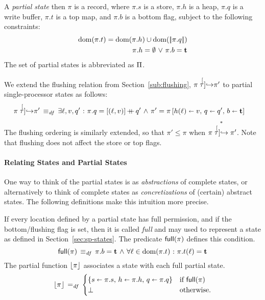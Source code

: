 \documentclass[11pt]{report}
\begin{document}
A \emph{partial state} then $\pi$ is a record, where $\pi.s$ is a store, $\pi.h$ is a heap, $\pi.q$ is a write buffer, $\pi.t$ is a top map, and $\pi.b$ is a bottom flag, subject to the following constraints: \begin{align}
	\operatorname{\mathrm{dom}}(\pi.t) = \operatorname{\mathrm{dom}}(\pi.h) \cup \operatorname{\mathrm{dom}}(|\!|\pi.q|\!|) \\
	\pi.h = \operatorname{\emptyset} \operatorname{\,\vee\,} \pi.b = \mathbf{t}
\end{align} The set of partial states is abbreviated as $\Pi$.

We extend the flushing relation from Section~\ref{sub:flushing}, $\pi \stackrel[\tau]{}{\operatorname{\hookrightarrow}} \pi'$ to partial single-processor states as follows:  \begin{equation}
\begin{split}
	\label{eq:ptaustep}
	\pi \stackrel[\tau]{}{\operatorname{\hookrightarrow}} \pi' \operatorname{\;\equiv_{\mathit{df}}\;} {} & \exists \ell, v, q' \operatorname{\,:\,} \pi.q = \left[(\ell,v)\right]\operatorname{+\!\!\!+} q' \operatorname{\,\wedge\,} \pi' = \pi \left[ h(\ell) \shortleftarrow v,\,q \shortleftarrow q',\,b \shortleftarrow \mathbf{t} \right]
\end{split}
\end{equation} The flushing ordering is similarly extended, so that $\pi' \leq \pi$ when $\pi \stackrel{\ast}{\stackrel[\tau]{}{\operatorname{\hookrightarrow}}} \pi'$. Note that flushing does not affect the store or top flags. 

\paragraph{Relating States and Partial States}

One way to think of the partial states is as \emph{abstractions} of complete states, or alternatively to think of complete states as \emph{concretizations} of (certain) abstract states. The following definitions make this intuition more precise. 

If every location defined by a partial state has full permission, and if the bottom/flushing flag is set, then it is called \emph{full} and may used to represent a state as defined in Section~\ref{sec:sp-states}. The predicate $\mathsf{full}(\pi)$ defines this condition. \begin{equation}
	\mathsf{full}(\pi)  \operatorname{\;\equiv_{\mathit{df}}\;}   \pi.b = \mathbf{t} \operatorname{\,\wedge\,} \forall \ell \in \operatorname{\mathrm{dom}}(\pi.t) \operatorname{\,:\,} \pi.t(\ell) = \mathbf{t} 
\end{equation}
The partial function $\left\lfloor\pi\right\rfloor$ associates a state with each full partial state. \begin{equation}
	\left\lfloor\pi\right\rfloor \operatorname{\;=_{\mathit{df}}\;} \begin{cases}
		\left\lbrace s \shortleftarrow \pi.s,\,h \shortleftarrow \pi.h,\,q \shortleftarrow \pi.q \right\rbrace & \text{if $\mathsf{full}(\pi)$} \\
		\bot & \text{otherwise.}
	\end{cases}
\end{equation}
\end{document}
